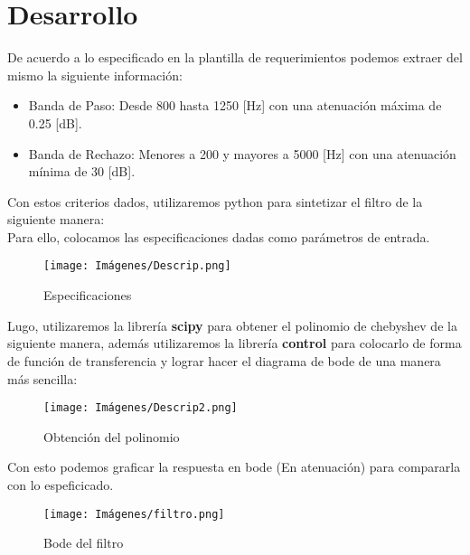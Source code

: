 \newpage
\section{Desarrollo}
    De acuerdo a lo especificado en la plantilla de requerimientos podemos extraer del mismo la siguiente información:\\

    \begin{itemize}
        \item Banda de Paso: Desde 800 hasta 1250 [Hz] con una atenuación máxima de 0.25 [dB].
        \item Banda de Rechazo: Menores a 200 y mayores a 5000 [Hz] con una atenuación mínima de 30 [dB].
    \end{itemize}

    Con estos criterios dados, utilizaremos python para sintetizar el filtro de la siguiente manera:\\

    Para ello, colocamos las especificaciones dadas como parámetros de entrada.\\

    \begin{figure}[ht]
        \centering
        \texttt{[image: Imágenes/Descrip.png]}
        \caption{Especificaciones}
    \end{figure}

    Lugo, utilizaremos la librería \textbf{scipy} para obtener el polinomio de chebyshev de la siguiente manera, además utilizaremos la librería \textbf{control} para colocarlo de forma de función de transferencia y lograr hacer el diagrama de bode de una manera más sencilla:\\
    
    \begin{figure}[ht]
        \centering
        \texttt{[image: Imágenes/Descrip2.png]}
        \caption{Obtención del polinomio}
    \end{figure}

    Con esto podemos graficar la respuesta en bode (En atenuación) para compararla con lo espeficicado.\\
    
    \begin{figure}[ht]
        \centering
        \texttt{[image: Imágenes/filtro.png]}
        \caption{Bode del filtro}
    \end{figure} 

    \newpage

